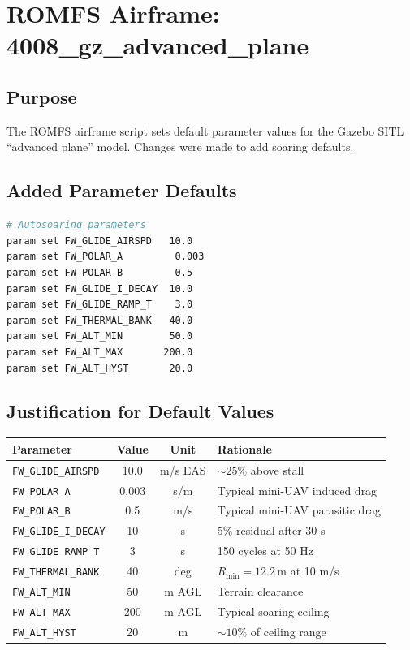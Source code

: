 \documentclass[12pt,a4paper]{article}
\begin{document}
\section{ROMFS Airframe: 4008\_gz\_advanced\_plane}

\subsection{Purpose}

The ROMFS airframe script sets default parameter values for the Gazebo
SITL ``advanced plane'' model. Changes were made to add soaring defaults.

\subsection{Added Parameter Defaults}

\begin{lstlisting}[language=bash]
# Autosoaring parameters
param set FW_GLIDE_AIRSPD   10.0
param set FW_POLAR_A         0.003
param set FW_POLAR_B         0.5
param set FW_GLIDE_I_DECAY  10.0
param set FW_GLIDE_RAMP_T    3.0
param set FW_THERMAL_BANK   40.0
param set FW_ALT_MIN        50.0
param set FW_ALT_MAX       200.0
param set FW_ALT_HYST       20.0
\end{lstlisting}

\subsection{Justification for Default Values}

\begin{center}
\begin{tabular}{lccl}
\toprule
Parameter & Value & Unit & Rationale \\
\midrule
\texttt{FW\_GLIDE\_AIRSPD}  & 10.0 & m/s EAS & $\sim 25\%$ above stall \\
\texttt{FW\_POLAR\_A}        & 0.003 & s/m   & Typical mini-UAV induced drag \\
\texttt{FW\_POLAR\_B}        & 0.5 & m/s     & Typical mini-UAV parasitic drag \\
\texttt{FW\_GLIDE\_I\_DECAY} & 10 & s        & 5\% residual after 30 s \\
\texttt{FW\_GLIDE\_RAMP\_T}  & 3 & s         & 150 cycles at 50 Hz \\
\texttt{FW\_THERMAL\_BANK}   & 40 & deg       & $R_{\min}=12.2\,\text{m}$ at 10 m/s \\
\texttt{FW\_ALT\_MIN}        & 50 & m AGL     & Terrain clearance \\
\texttt{FW\_ALT\_MAX}        & 200 & m AGL    & Typical soaring ceiling \\
\texttt{FW\_ALT\_HYST}       & 20 & m         & $\sim 10\%$ of ceiling range \\
\bottomrule
\end{tabular}
\end{center}
\end{document}

